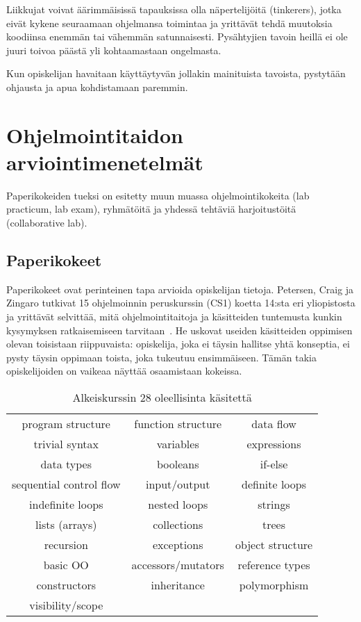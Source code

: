 \documentclass[finnish]{../tktltiki2}
\theoremstyle{definition}
\theoremstyle{remark}
\begin{document}
Liikkujat voivat äärimmäisissä tapauksissa olla näpertelijöitä (tinkerers), jotka eivät kykene seuraamaan ohjelmansa toimintaa ja yrittävät tehdä muutoksia koodiinsa enemmän tai vähemmän satunnaisesti. Pysähtyjien tavoin heillä ei ole juuri toivoa päästä yli kohtaamastaan ongelmasta.

Kun opiskelijan havaitaan käyttäytyvän jollakin mainituista tavoista, pystytään ohjausta ja apua kohdistamaan paremmin.

\section{Ohjelmointitaidon arviointimenetelmät}

Paperikokeiden tueksi on esitetty muun muassa ohjelmointikokeita (lab practicum, lab exam), ryhmätöitä ja yhdessä tehtäviä harjoitustöitä (collaborative lab).

\subsection{Paperikokeet}

Paperikokeet ovat perinteinen tapa arvioida opiskelijan tietoja. Petersen, Craig ja Zingaro tutkivat 15 ohjelmoinnin peruskurssin (CS1) koetta 14:sta eri yliopistosta ja yrittävät selvittää, mitä ohjelmointitaitoja ja käsitteiden tuntemusta kunkin kysymyksen ratkaisemiseen tarvitaan~\cite{PCZ11}. He uskovat useiden käsitteiden oppimisen olevan toisistaan riippuvaista: opiskelija, joka ei täysin hallitse yhtä konseptia, ei pysty täysin oppimaan toista, joka tukeutuu ensimmäiseen. Tämän takia opiskelijoiden on vaikeaa näyttää osaamistaan kokeissa.

\begin{table}[b]
  \begin{tabular}{ c c c }
    program structure & function structure & data flow \\
    trivial syntax & variables & expressions \\
    data types & booleans & if-else \\
    sequential control flow & input/output & definite loops \\
    indefinite loops & nested loops & strings \\
    lists (arrays) & collections & trees \\
    recursion & exceptions & object structure \\
    basic OO & accessors/mutators & reference types \\
    constructors & inheritance & polymorphism \\
    visibility/scope \\
  \end{tabular}
\caption{Alkeiskurssin 28 oleellisinta käsitettä}
\label{tab:kasitteet}
\end{table}
\end{document}
